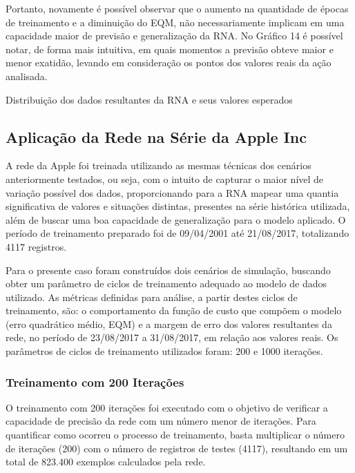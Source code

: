 Portanto, novamente é possível observar que o aumento na quantidade de épocas de treinamento e a diminuição do EQM, não necessariamente implicam em uma capacidade maior de previsão e generalização da RNA. No Gráfico 14 é possível notar, de forma mais intuitiva, em quais momentos a previsão obteve maior e menor exatidão, levando em consideração os pontos dos valores reais da ação analisada.

\begin{grafico}[h]
	\centering
	\caption{Distribuição dos dados resultantes da RNA e seus valores esperados}
	\label{lingua}
\end{grafico}

\subsection{Aplicação da Rede na Série da Apple Inc}
A rede da Apple foi treinada utilizando as mesmas técnicas dos cenários anteriormente testados, ou seja, com o intuito de capturar o maior nível de variação possível dos dados, proporcionando para a RNA mapear uma quantia significativa de valores e situações distintas, presentes na série histórica utilizada, além de buscar uma boa capacidade de generalização para o modelo aplicado. O período de treinamento preparado foi de 09/04/2001 até 21/08/2017, totalizando 4117 registros.

Para o presente caso foram construídos dois cenários de simulação, buscando obter um parâmetro de ciclos de treinamento adequado ao modelo de dados utilizado. As métricas definidas para análise, a partir destes ciclos de treinamento, são: o comportamento da função de custo que compõem o modelo (erro quadrático médio, EQM) e a margem de erro dos valores resultantes da rede, no período de 23/08/2017 a 31/08/2017, em relação aos valores reais. Os parâmetros de ciclos de treinamento utilizados foram: 200 e 1000 iterações.

\subsubsection{Treinamento com 200 Iterações}	
O treinamento com 200 iterações foi executado com o objetivo de verificar a capacidade de precisão da rede com um número menor de iterações. Para quantificar como ocorreu o processo de treinamento, basta multiplicar o número de iterações (200) com o número de registros de testes (4117), resultando em um total de 823.400 exemplos calculados pela rede.


